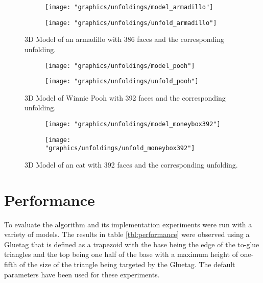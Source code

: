 \documentclass[draft,final]{vutinfth} %
\begin{document}
\begin{figure}
  \begin{subfigure}[b]{0.475\textwidth}
    \texttt{[image: "graphics/unfoldings/model\_armadillo"]}
  \end{subfigure}
  \begin{subfigure}[b]{0.475\textwidth}
    \texttt{[image: "graphics/unfoldings/unfold\_armadillo"]}
  \end{subfigure}
  
  \caption{3D Model of an armadillo with 386 faces and the corresponding unfolding.}
  \label{fig:armadillo}
\end{figure}

\begin{figure}
  \begin{subfigure}[b]{0.475\textwidth}
    \texttt{[image: "graphics/unfoldings/model\_pooh"]}
  \end{subfigure}
  \begin{subfigure}[b]{0.475\textwidth}
    \texttt{[image: "graphics/unfoldings/unfold\_pooh"]}
  \end{subfigure}
  
  \caption{3D Model of Winnie Pooh with 392 faces and the corresponding unfolding.}
  \label{fig:pooh}
\end{figure}

\begin{figure}
  \begin{subfigure}[b]{0.475\textwidth}
    \texttt{[image: "graphics/unfoldings/model\_moneybox392"]}
  \end{subfigure}
  \begin{subfigure}[b]{0.475\textwidth}
    \texttt{[image: "graphics/unfoldings/unfold\_moneybox392"]}
  \end{subfigure}
  
  \caption{3D Model of an cat with 392 faces and the corresponding unfolding.}
  \label{fig:moneybox392}
\end{figure}

\section{Performance}
\label{sec:performance}

To evaluate the algorithm and its implementation experiments were run with a variety of models. The results in table \ref{tbl:performance} were observed using a Gluetag that is defined as a trapezoid with the base being the edge of the to-glue triangles and the top being one half of the base with a maximum height of one-fifth of the size of the triangle being targeted by the Gluetag. The default parameters have been used for these experiments.
\end{document}

